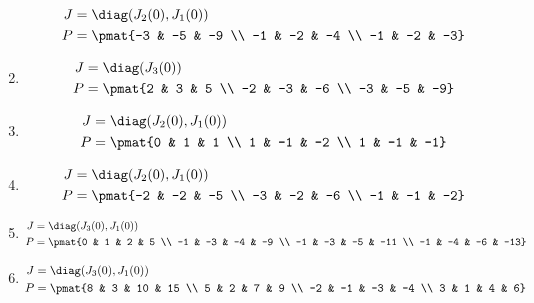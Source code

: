 \begin{enumerate}
\begin{align*}
J &= \diag(J_{2}(0), J_{1}(0))\\
P &= \pmat{-3 & -5 & -9 \\ -1 & -2 & -4 \\ -1 & -2 & -3}
\end{align*}

\item

\begin{align*}
J &= \diag(J_{3}(0))\\
P &= \pmat{2 & 3 & 5 \\ -2 & -3 & -6 \\ -3 & -5 & -9}
\end{align*}

\item

\begin{align*}
J &= \diag(J_{2}(0), J_{1}(0))\\
P &= \pmat{0 & 1 & 1 \\ 1 & -1 & -2 \\ 1 & -1 & -1}
\end{align*}

\item

\begin{align*}
J &= \diag(J_{2}(0), J_{1}(0))\\
P &= \pmat{-2 & -2 & -5 \\ -3 & -2 & -6 \\ -1 & -1 & -2}
\end{align*}

\item

\begin{align*}
J &= \diag(J_{3}(0), J_{1}(0))\\
P &= \pmat{0 & 1 & 2 & 5 \\ -1 & -3 & -4 & -9 \\ -1 & -3 & -5 & -11 \\ -1 & -4 & -6 & -13}
\end{align*}

\item

\begin{align*}
J &= \diag(J_{3}(0), J_{1}(0))\\
P &= \pmat{8 & 3 & 10 & 15 \\ 5 & 2 & 7 & 9 \\ -2 & -1 & -3 & -4 \\ 3 & 1 & 4 & 6}
\end{align*}


\end{enumerate}
